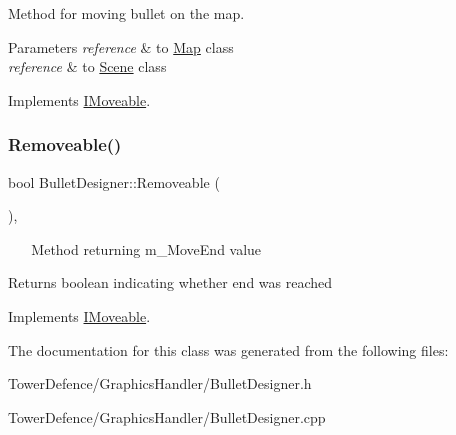 Method for moving bullet on the map. 


\begin{DoxyParams}{Parameters}
{\em reference} & to \mbox{\hyperlink{class_map}{Map}} class \\
\hline
{\em reference} & to \mbox{\hyperlink{class_scene}{Scene}} class \\
\hline
\end{DoxyParams}


Implements \mbox{\hyperlink{class_i_moveable}{I\+Moveable}}.

\mbox{\label{class_bullet_designer_a6287b58f72235fa91e103fa4400bdf12}} 
\subsubsection{\texorpdfstring{Removeable()}{Removeable()}}
{\footnotesize\ttfamily bool Bullet\+Designer\+::\+Removeable (\begin{DoxyParamCaption}{ }\end{DoxyParamCaption})\hspace{0.3cm}{\ttfamily [override]}, {\ttfamily [virtual]}}



~\newline
~\newline
Method returning m\+\_\+\+Move\+End value 

\begin{DoxyReturn}{Returns}
boolean indicating whether end was reached 
\end{DoxyReturn}


Implements \mbox{\hyperlink{class_i_moveable}{I\+Moveable}}.



The documentation for this class was generated from the following files\+:\begin{DoxyCompactItemize}
\item 
Tower\+Defence/\+Graphics\+Handler/Bullet\+Designer.\+h\item 
Tower\+Defence/\+Graphics\+Handler/Bullet\+Designer.\+cpp\end{DoxyCompactItemize}
